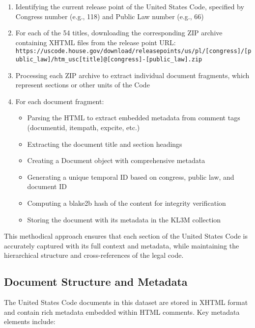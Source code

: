 \begin{enumerate}
    \item Identifying the current release point of the United States Code, specified by Congress number (e.g., 118) and Public Law number (e.g., 66)
    
    \item For each of the 54 titles, downloading the corresponding ZIP archive containing XHTML files from the release point URL: \texttt{https://uscode.house.gov/download/releasepoints/us/pl/[congress]/[public\_law]/htm\_usc[title]@[congress]-[public\_law].zip}
    
    \item Processing each ZIP archive to extract individual document fragments, which represent sections or other units of the Code
    
    \item For each document fragment:
    \begin{itemize}
        \item Parsing the HTML to extract embedded metadata from comment tags (documentid, itempath, expcite, etc.)
        \item Extracting the document title and section headings
        \item Creating a Document object with comprehensive metadata
        \item Generating a unique temporal ID based on congress, public law, and document ID
        \item Computing a blake2b hash of the content for integrity verification
        \item Storing the document with its metadata in the KL3M collection
    \end{itemize}
\end{enumerate}

This methodical approach ensures that each section of the United States Code is accurately captured with its full context and metadata, while maintaining the hierarchical structure and cross-references of the legal code.

\subsection{Document Structure and Metadata}

The United States Code documents in this dataset are stored in XHTML format and contain rich metadata embedded within HTML comments. Key metadata elements include:

